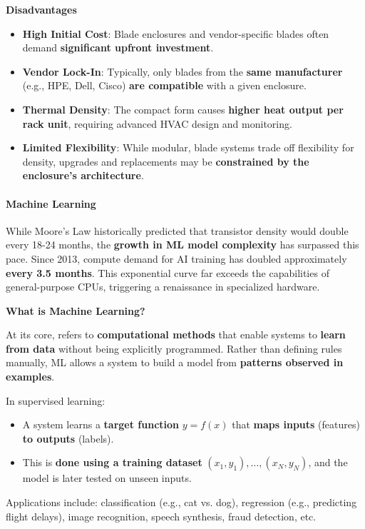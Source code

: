 \highspace
\begin{flushleft}
    \textcolor{Red2}{ \textbf{Disadvantages}}
\end{flushleft}
\begin{itemize}[label=\textcolor{Red2}{}]
    \item \textcolor{Red2}{\textbf{High Initial Cost}}: Blade enclosures and vendor-specific blades often demand \textbf{significant upfront investment}.
    \item \textcolor{Red2}{\textbf{Vendor Lock-In}}: Typically, only blades from the \textbf{same manufacturer} (e.g., HPE, Dell, Cisco) \textbf{are compatible} with a given enclosure.
    \item \textcolor{Red2}{\textbf{Thermal Density}}: The compact form causes \textbf{higher heat output per rack unit}, requiring advanced HVAC design and monitoring.
    \item \textcolor{Red2}{\textbf{Limited Flexibility}}: While modular, blade systems trade off flexibility for density, upgrades and replacements may be \textbf{constrained by the enclosure's architecture}.
\end{itemize}

\newpage

\paragraph{Machine Learning}

While Moore's Law historically predicted that transistor density would double every 18-24 months, the \textbf{growth in ML model complexity} has surpassed this pace. Since 2013, compute demand for AI training has doubled approximately \textbf{every 3.5 months}. This exponential curve far exceeds the capabilities of general-purpose CPUs, triggering a renaissance in specialized hardware.

\highspace
\begin{flushleft}
    \textcolor{Green3}{ \textbf{What is Machine Learning?}}
\end{flushleft}
At its core,  refers to \textbf{computational methods} that enable systems to \textbf{learn from data} without being explicitly programmed. Rather than defining rules manually, ML allows a system to build a model from \textbf{patterns observed in examples}.

\highspace
In supervised learning:
\begin{itemize}
    \item A system learns a \textbf{target function} $y = f\left(x\right)$ that \textbf{maps inputs} (features) \textbf{to outputs} (labels).
    \item This is \textbf{done using a training dataset} $\left(x_{1}, y_{1}\right), \dots, \left(x_{N}, y_{N}\right)$, and the model is later tested on unseen inputs.
\end{itemize}
Applications include: classification (e.g., cat vs. dog), regression (e.g., predicting flight delays), image recognition, speech synthesis, fraud detection, etc.

